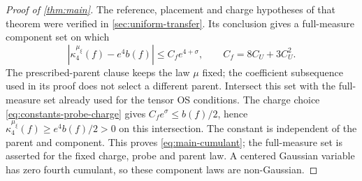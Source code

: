 \begin{proof}[Proof of \cref{thm:main}]
The reference, placement and charge hypotheses of that theorem
were verified in \cref{sec:uniform-transfer}. Its conclusion
 gives a full-measure component set on which
\[
 |\kappa_4^{\mu_\xi}(f)-e^4b(f)|\le C_fe^{4+\sigma},
 \qquad C_f=8C_U+3C_U^2.
\]
The prescribed-parent clause keeps the law $\mu$ fixed;
the coefficient subsequence used in its proof does not select
a different parent. Intersect this set with the full-measure
set already used for the tensor OS conditions.
The charge choice \eqref{eq:constants-probe-charge} gives
$C_fe^\sigma\le b(f)/2$, hence
$\kappa_4^{\mu_\xi}(f)\ge e^4b(f)/2>0$ on this intersection.
The constant is independent of the parent and component.
This proves \eqref{eq:main-cumulant}; the full-measure set
is asserted for the fixed charge, probe and parent law.
A centered Gaussian variable has zero fourth cumulant, so
these component laws are non-Gaussian.
\end{proof}
